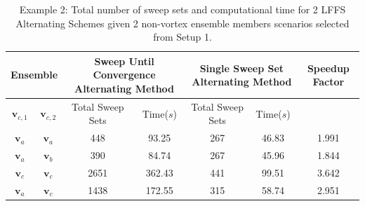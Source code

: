 \documentclass[pdflatex,sn-mathphys-num]{sn-jnl}%
\def \bv{{\mathbf {v}}}
\theoremstyle{thmstyleone}%
\theoremstyle{thmstyletwo}%
\theoremstyle{thmstylethree}%
\begin{document}
\begin{table}[h!]
    \centering
                \begin{tabular}{|c|c|c|c|c|c|c|} \hline 

                \multicolumn{2}{|c|}{Ensemble} &
                \multicolumn{2}{|p{3.7cm}|}{\centering Sweep Until Convergence Alternating Method}
                &
                \multicolumn{2}{|p{3.7cm}|}{\centering Single Sweep Set Alternating Method}&
                \multicolumn{1}{|c|}{Speedup Factor}\\ \hline

                $\bv_{c,1}$ & $\bv_{c,2}$ & Total Sweep Sets & Time($s$) & Total Sweep Sets & Time($s$) &  \\ \hline

                $\bv_a$ & $\bv_a$ & 448 & 93.25 & 267 & 46.83 & 1.991\\ \hline


                $\bv_a$ & $\bv_b$ & 390 & 84.74 & 267 & 45.96 & 1.844\\ \hline

                $\bv_c$ & $\bv_c$ & 2651 & 362.43 & 441 & 99.51 & 3.642\\ \hline

                $\bv_a$ & $\bv_c$ & 1438 & 172.55 & 315 & 58.74 & 2.951\\ \hline

                 
                 
            \end{tabular}
    \caption{Example 2: Total number of sweep sets and computational time for 2 LFFS Alternating Schemes given 2 non-vortex ensemble members scenarios selected from Setup 1.}
    \label{tab:2a}
\end{table}
\end{document}

